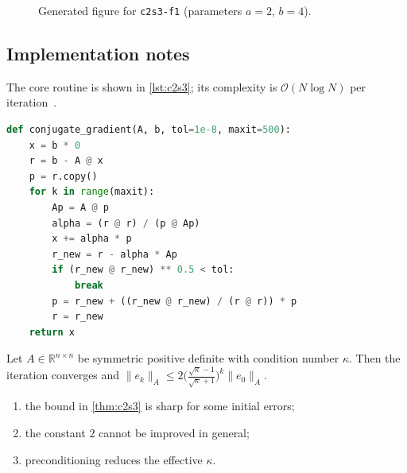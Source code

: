 \begin{figure}[htbp]
\centering
{}
\caption{Generated figure for \texttt{c2s3-f1} (parameters $a=2$, $b=4$).}\label{fig:c2s3-f1}
\end{figure}

\lipsum[10-11]

\subsection{Implementation notes}\label{sec:c2s3-i}
The core routine is shown in \cref{lst:c2s3}; its complexity is $\mathcal{O}(N\log N)$ per iteration~\cite{ch2-5}.

\begin{lstlisting}[language=python,caption={Reference implementation for c2s3.},label={lst:c2s3}]
def conjugate_gradient(A, b, tol=1e-8, maxit=500):
    x = b * 0
    r = b - A @ x
    p = r.copy()
    for k in range(maxit):
        Ap = A @ p
        alpha = (r @ r) / (p @ Ap)
        x += alpha * p
        r_new = r - alpha * Ap
        if (r_new @ r_new) ** 0.5 < tol:
            break
        p = r_new + ((r_new @ r_new) / (r @ r)) * p
        r = r_new
    return x
\end{lstlisting}

\lipsum[29-29]
\begin{theorem}\label{thm:c2s3}
Let $A\in\mathbb{R}^{n\times n}$ be symmetric positive definite with condition number $\kappa$. Then the iteration converges and
$\lVert e_k\rVert_A \le 2\bigl(\tfrac{\sqrt\kappa-1}{\sqrt\kappa+1}\bigr)^k\lVert e_0\rVert_A$.
\end{theorem}
\begin{enumerate}[label=(\roman*)]
\item the bound in \cref{thm:c2s3} is sharp for some initial errors;
\item the constant $2$ cannot be improved in general;
\item preconditioning reduces the effective $\kappa$.
\end{enumerate}

\lipsum[126-126]

